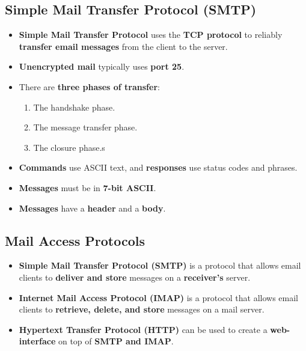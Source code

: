 \documentclass{article}
\begin{document}
    \subsection*{Simple Mail Transfer Protocol (SMTP)}
    \begin{itemize}
        \item \textbf{Simple Mail Transfer Protocol} uses the \textbf{TCP protocol} to reliably \textbf{transfer email messages} from the client to the server.
        \item \textbf{Unencrypted mail} typically uses \textbf{port 25}.
        \item There are \textbf{three phases of transfer}:
        \begin{enumerate}
            \item The handshake phase.
            \item The message transfer phase.
            \item The closure phase.s
        \end{enumerate}
        \item \textbf{Commands} use ASCII text, and \textbf{responses} use status codes and phrases.
        \item \textbf{Messages} must be in \textbf{7-bit ASCII}.
        \item \textbf{Messages} have a \textbf{header} and a \textbf{body}.
    \end{itemize}

    \subsection*{Mail Access Protocols}
    \begin{itemize}
        \item \textbf{Simple Mail Transfer Protocol (SMTP)} is a protocol that allows email clients to \textbf{deliver and store} messages on a \textbf{receiver's} server.
        \item \textbf{Internet Mail Access Protocol (IMAP)} is a protocol that allows email clients to \textbf{retrieve, delete, and store} messages on a mail server.
        \item \textbf{Hypertext Transfer Protocol (HTTP)} can be used to create a \textbf{web-interface} on top of \textbf{SMTP and IMAP}.
    \end{itemize}

    \section*{}
\end{document}
